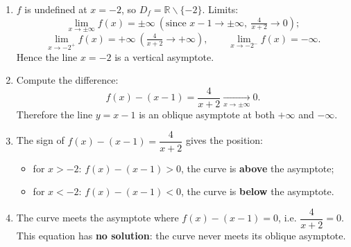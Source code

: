 \documentclass[11pt]{article}
\newcommand{\cle}[1]{{\popxbold\color{popdark}#1}}
\def\setminus{\mathbin{\backslash}}\let\smallsetminus\setminus
\begin{document}
\begin{corrige}
\begin{enumerate}
\item $f$ is undefined at $x=-2$, so $D_f=\mathbb{R}\setminus\{-2\}$. Limits:
\[ \lim_{x\to\pm\infty}f(x)=\pm\infty\ (\text{since } x-1\to\pm\infty,\ \tfrac{4}{x+2}\to 0); \]
\[ \lim_{x\to -2^{+}}f(x)=+\infty\ (\tfrac{4}{x+2}\to+\infty),\qquad \lim_{x\to -2^{-}}f(x)=-\infty. \]
Hence the line $x=-2$ is a \cle{vertical asymptote}.
\item Compute the difference:
\[ f(x)-(x-1)=\frac{4}{x+2}\xrightarrow[x\to\pm\infty]{}0. \]
Therefore the line $y=x-1$ is an \cle{oblique asymptote} at both $+\infty$ and $-\infty$.
\item The sign of $f(x)-(x-1)=\dfrac{4}{x+2}$ gives the position:
\begin{itemize}
\item for $x>-2$: $f(x)-(x-1)>0$, the curve is \textbf{above} the asymptote;
\item for $x<-2$: $f(x)-(x-1)<0$, the curve is \textbf{below} the asymptote.
\end{itemize}
\item The curve meets the asymptote where $f(x)-(x-1)=0$, i.e. $\dfrac{4}{x+2}=0$. This equation has \textbf{no solution}: the curve never meets its oblique asymptote.
\end{enumerate}
\end{corrige}
\end{document}
